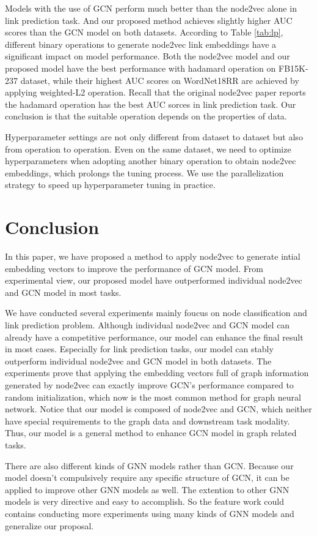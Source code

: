 \documentclass[sigconf]{acmart}
\begin{document}
Models with the use of GCN perform much better than the node2vec alone in link prediction task. And our proposed method achieves slightly higher AUC scores than the GCN model on both datasets. According to Table \ref{tab:lp}, different binary operations to generate node2vec link embeddings have a significant impact on model performance. Both the node2vec model and our proposed model have the best performance with hadamard operation on FB15K-237 dataset, while their highest AUC scores on WordNet18RR are achieved by applying weighted-L2 operation. Recall that the original node2vec paper \cite{node2vec} reports the hadamard operation has the best AUC sorces in link prediction task. Our conclusion is that the suitable operation depends on the properties of data. 

Hyperparameter settings are not only different from dataset to dataset but also from operation to operation. Even on the same dataset, we need to optimize hyperparameters when adopting another binary operation to obtain node2vec embeddings, which prolongs the tuning process. We use the parallelization strategy to speed up hyperparameter tuning in practice.

\section{Conclusion}
In this paper, we have proposed a method to apply node2vec to generate intial embedding vectors to improve the performance of GCN model. From experimental view, our proposed model have outperformed individual node2vec and GCN model in most tasks. 

We have conducted several experiments mainly foucus on node classification and link prediction problem. Although individual node2vec and GCN model can already have a competitive performance, our model can enhance the final result in most cases. Especially for link prediction tasks, our model can stably outperform individual node2vec and GCN model in both datasets. The experiments prove that applying the embedding vectors full of graph information generated by node2vec can exactly improve GCN's performance compared to random initialization, which now is the most common method for graph neural network. Notice that our model is composed of node2vec and GCN, which neither have special requirements to the graph data and downstream task modality. Thus, our model is a general method to enhance GCN model in graph related tasks.

There are also different kinds of GNN models rather than GCN. Because our model doesn't compulsively require any specific structure of GCN, it can be applied to improve other GNN models as well. The extention to other GNN models is very directive and easy to accomplish. So the feature work could contains conducting more experiments using many kinds of GNN models and generalize our proposal.
\end{document}
